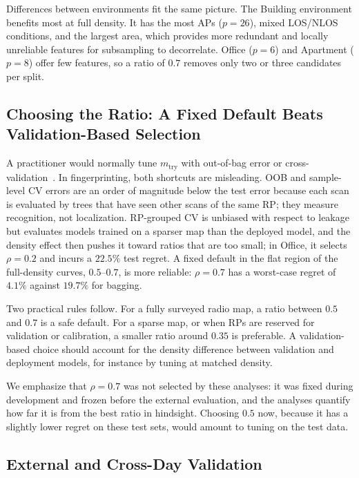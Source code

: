 Differences between environments fit the same picture. The Building environment benefits most at full density. It has the most APs ($p=26$), mixed LOS/NLOS conditions, and the largest area, which provides more redundant and locally unreliable features for subsampling to decorrelate. Office ($p=6$) and Apartment ($p=8$) offer few features, so a ratio of $0.7$ removes only two or three candidates per split.

\subsection{Choosing the Ratio: A Fixed Default Beats Validation-Based Selection}
\label{subsec:discussion_selection}

A practitioner would normally tune $m_{\mathrm{try}}$ with out-of-bag error or cross-validation~\cite{probst2019hyperparameters}. In fingerprinting, both shortcuts are misleading. OOB and sample-level CV errors are an order of magnitude below the test error because each scan is evaluated by trees that have seen other scans of the same RP; they measure recognition, not localization. RP-grouped CV is unbiased with respect to leakage but evaluates models trained on a sparser map than the deployed model, and the density effect then pushes it toward ratios that are too small; in Office, it selects $\rho=0.2$ and incurs a $22.5\%$ test regret. A fixed default in the flat region of the full-density curves, $0.5$--$0.7$, is more reliable: $\rho=0.7$ has a worst-case regret of $4.1\%$ against $19.7\%$ for bagging.

Two practical rules follow. For a fully surveyed radio map, a ratio between $0.5$ and $0.7$ is a safe default. For a sparse map, or when RPs are reserved for validation or calibration, a smaller ratio around $0.35$ is preferable. A validation-based choice should account for the density difference between validation and deployment models, for instance by tuning at matched density.

We emphasize that $\rho=0.7$ was not selected by these analyses: it was fixed during development and frozen before the external evaluation, and the analyses quantify how far it is from the best ratio in hindsight. Choosing $0.5$ now, because it has a slightly lower regret on these test sets, would amount to tuning on the test data.

\subsection{External and Cross-Day Validation}
\label{subsec:discussion_external}

